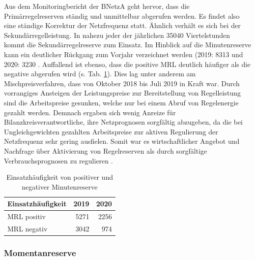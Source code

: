			Aus dem Monitoringbericht der BNetzA geht hervor, dass die Primärregelreserven ständig und unmittelbar abgerufen werden. 
			Es findet also eine ständige Korrektur der Netzfrequenz statt.
			Ähnlich verhält es sich bei der Sekundärregelleistung. 
			In nahezu jeder der jährlichen \num{35040} Viertelstunden kommt die Sekundärregelreserve zum Einsatz.
			Im Hinblick auf die Minutenreserve kann ein deutlicher Rückgang zum Vorjahr verzeichnet werden (2019: 8313 und 2020: 3230 \cite{Monitoringbericht_BNetzA}.
			Auffallend ist ebenso, dass die positive MRL deutlich häufiger als die negative abgerufen wird (s. Tab. \ref{Tab. Abrufen von Minutenreserve}).
			Dies lag unter anderem am Mischpreisverfahren, dass von Oktober 2018 bis Juli 2019 in Kraft war.
			Durch vorrangiges Ansteigen der Leistungspreise zur Bereitstellung von Regelleistung sind die Arbeitspreise gesunken, welche nur bei einem Abruf von Regelenergie gezahlt werden.
			Demnach ergaben sich wenig Anreize für Bilanzkreisverantwortliche, ihre Netzprognosen sorgfältig abzugeben, da die bei Ungleichgewichten gezahlten Arbeitspreise zur aktiven Regulierung der Netzfrequenz sehr gering ausfielen.
			Somit war es wirtschaftlicher Angebot und Nachfrage über Aktivierung von Regelreserven als durch sorgfältige Verbrauchsprognosen zu regulieren \cite{Monitoringbericht_BNetzA}.
						
			\begin{table}[H]
				\centering
				\caption{Einsatzhäufigkeit von positiver und negativer Minutenreserve \cite{Monitoringbericht_BNetzA}}
				\label{Tab. Abrufen von Minutenreserve}
				\begin{tabular}{lrr}
					\hline
					Einsatzhäufigkeit & 2019 & 2020 \\ \hline
					MRL positiv & 5271 & 2256 \\
					MRL negativ & 3042 & 974 \\ \hline
				\end{tabular}
			\end{table}
							
		\subsubsection{Momentanreserve}
		
